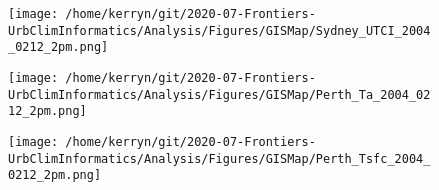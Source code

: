 \documentclass{article}
\begin{document}
\begin{figure}
\centering    
\texttt{[image: /home/kerryn/git/2020-07-Frontiers-UrbClimInformatics/Analysis/Figures/GISMap/Sydney\_UTCI\_2004\_0212\_2pm.png]}
\end{figure} 
\clearpage


\begin{figure}
\centering    
\texttt{[image: /home/kerryn/git/2020-07-Frontiers-UrbClimInformatics/Analysis/Figures/GISMap/Perth\_Ta\_2004\_0212\_2pm.png]}
\end{figure} 
\clearpage

\begin{figure}
\centering    
\texttt{[image: /home/kerryn/git/2020-07-Frontiers-UrbClimInformatics/Analysis/Figures/GISMap/Perth\_Tsfc\_2004\_0212\_2pm.png]}
\end{figure} 
\clearpage



\begin{figure}
\centering    
{}
\end{figure} 
\clearpage
\end{document}
